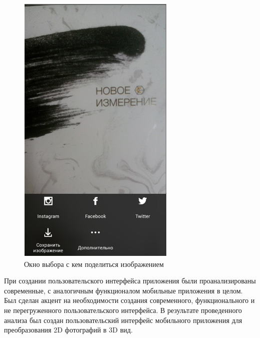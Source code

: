\begin{figure}[H]
	\centering
	\includegraphics[width=0.3\linewidth]{pics/pod}
	\caption{Окно выбора с кем поделиться изображением}
	\label{fig:pod}
\end{figure}

При создании пользовательского интерфейса приложения были проанализированы современные, с аналогичным функционалом мобильные приложения в целом. Был сделан акцент на необходимости создания современного, функционального и не перегруженного пользовательского интерфейса. В результате проведенного анализа был создан пользовательский интерфейс мобильного приложения для преобразования 2D фотографий в 3D вид.

